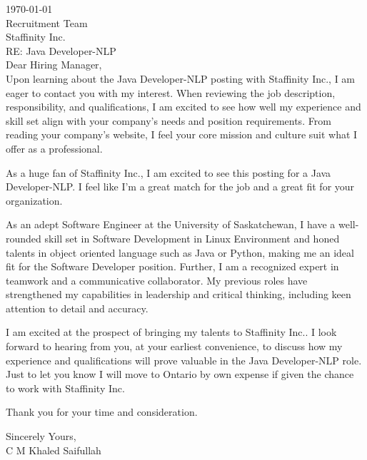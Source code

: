 \documentclass[10pt,a4paper,ragged2e,withhyper]{altacv}
\begin{document}

\makecvheader

\hfill \break
\hfill \break

\today\\
\hfill \break
Recruitment Team\\
Staffinity Inc.\\
\hfil \break
RE: Java Developer-NLP\\
\hfil \break
Dear Hiring Manager,\\
\hfill\break
Upon learning about the Java Developer-NLP posting with Staffinity Inc., I am eager to contact you with my interest. When reviewing the job description, responsibility, and qualifications, I am excited to see how well my experience and skill set align with your company's needs and position requirements. From reading your company's website, I feel your core mission and culture suit what I offer as a professional.\\
\hfill \break

As a huge fan of Staffinity Inc., I am excited to see this posting for a Java Developer-NLP. I feel like I'm a great match for the job and a great fit for your organization.\\
\hfill \break

As an adept Software Engineer at the University of Saskatchewan, I have a well-rounded skill set in Software Development in Linux Environment and honed talents in object oriented language such as Java or Python, making me an ideal fit for the Software Developer position. Further, I am a recognized expert in teamwork and a communicative collaborator. My previous roles have strengthened my capabilities in leadership and critical thinking, including keen attention to detail and accuracy.\\
\hfill \break

I am excited at the prospect of bringing my talents to Staffinity Inc.. I look forward to hearing from you, at your earliest convenience, to discuss how my experience and qualifications will prove valuable in the Java Developer-NLP role. Just to let you know I will move to Ontario by own expense if given the chance to work with Staffinity Inc.\\
\hfill \break

Thank you for your time and consideration.\\
\hfill \break

\hfill \break
\hfill \break
Sincerely Yours,\\
C M Khaled Saifullah
\end{document}
